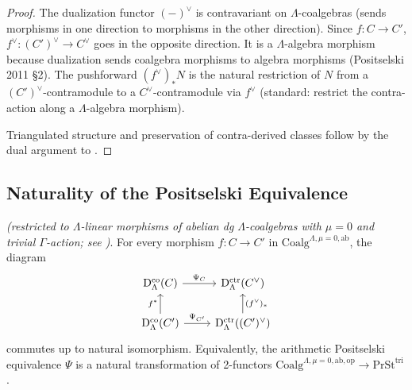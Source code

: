 \begin{proof}
The dualization functor \((-)^{\vee}\) is contravariant on
\(\Lambda\)-coalgebras (sends morphisms in one direction to
morphisms in the other direction). Since \(f\colon C\to C'\),
\(f^{\vee}\colon (C')^{\vee}\to C^{\vee}\) goes in the opposite
direction. It is a \(\Lambda\)-algebra morphism because
dualization sends coalgebra morphisms to algebra morphisms
(Positselski 2011 \S2). The pushforward
\((f^{\vee})_{*}N\) is the natural restriction of \(N\) from a
\((C')^{\vee}\)-contramodule to a \(C^{\vee}\)-contramodule via
\(f^{\vee}\) (standard: restrict the contra-action along a
\(\Lambda\)-algebra morphism).

Triangulated structure and preservation of contra-derived
classes follow by the dual argument to
.
\end{proof}

\subsection{Naturality of the Positselski Equivalence}

\begin{theorem}
\label{v4-arith:pos-costello:thm:C5-closed}
\ClaimStatusProvedHere \emph{(restricted to \(\Lambda\)-linear
morphisms of abelian dg \(\Lambda\)-coalgebras with \(\mu=0\) and
trivial \(\Gamma\)-action; see
)}. For every morphism
\(f\colon C\to C'\) in
\(\mathrm{Coalg}^{\Lambda,\mu=0,\mathrm{ab}}\), the diagram
\begin{equation}
\label{v4-arith:pos-costello:eq:C5-naturality}
\begin{tikzcd}
\mathrm{D}^{\mathrm{co}}_{\Lambda}(C) \ar[r, "\Psi_{C}"] & \mathrm{D}^{\mathrm{ctr}}_{\Lambda}(C^{\vee}) \\
\mathrm{D}^{\mathrm{co}}_{\Lambda}(C') \ar[u, "f^{*}"] \ar[r, "\Psi_{C'}"] & \mathrm{D}^{\mathrm{ctr}}_{\Lambda}((C')^{\vee}) \ar[u, "(f^{\vee})_{*}"']
\end{tikzcd}
\end{equation}
commutes up to natural isomorphism. Equivalently, the arithmetic
Positselski equivalence \(\Psi\) is a natural transformation of
2-functors
\(\mathrm{Coalg}^{\Lambda,\mu=0,\mathrm{ab},\mathrm{op}}\to\mathrm{PrSt}^{\mathrm{tri}}\).
\end{theorem}

